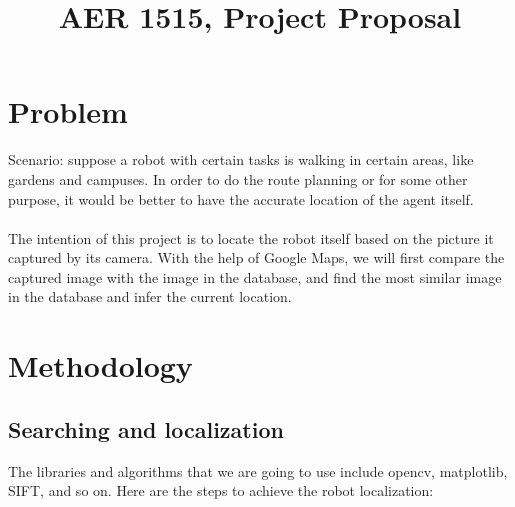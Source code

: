 \documentclass{article}
\title{AER 1515, Project Proposal}
\author{}
\begin{document}
\maketitle


\section{Problem}

Scenario: suppose a robot with certain tasks is walking in certain areas, like gardens and campuses. In order to do the route planning or for some other purpose, it would be better to have the accurate location of the agent itself.\\\\
The intention of this project is to locate the robot itself based on the picture it captured by its camera. With the help of Google Maps, we will first compare the captured image with the image in the database, and find the most similar image in the database and infer the current location.




\section{Methodology}

\subsection{Searching and localization}

The libraries and algorithms that we are going to use include opencv, matplotlib, SIFT, and so on. Here are the steps to achieve the robot localization:\\
\end{document}
